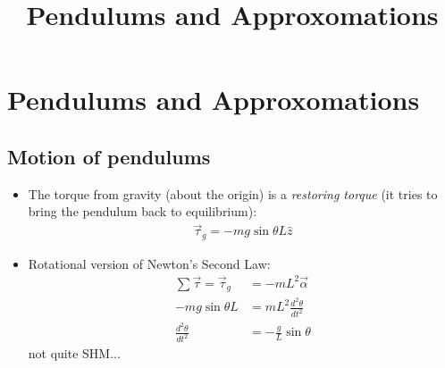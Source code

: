 \documentclass[aspectratio=169,
hyperref={colorlinks,urlcolor=blue}
]{beamer}
\begin{document}

\section{Pendulums and Approxomations}
\label{sec:pendulums}
\title{Pendulums and Approxomations}
\author{\insertsubsection}


\begin{frame}
\titlepage
\thispagestyle{empty}
\end{frame}

\subsection{Motion of pendulums}
\label{subsec:motionofpendulums}
{
\begin{itemize}
\item The torque from gravity (about the origin) is a \textit{restoring torque} (it tries to bring the pendulum back to equilibrium):
\begin{align*}
\vec \tau_g=-mg\sin\theta L\hat z
\end{align*}
\item Rotational version of Newton's Second Law:
\begin{align*}
\sum \vec \tau=\vec \tau_g&=-mL^2\vec\alpha\\
-mg\sin\theta L &=mL^2\frac{d^2\theta}{dt^2}\\
\frac{d^2\theta}{dt^2}&=-\frac{g}{L}\sin\theta
\end{align*}
not quite SHM...
\end{itemize}
}
\end{document}
